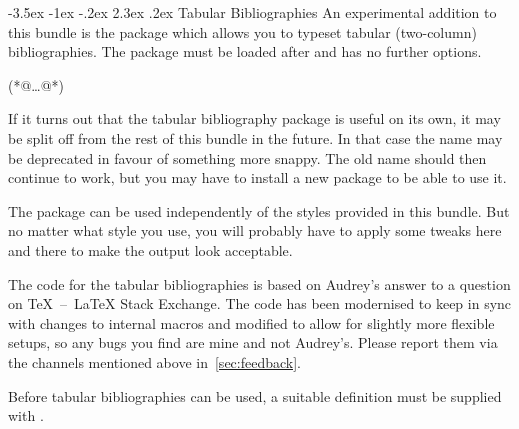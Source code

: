 \documentclass[11pt,a4paper]{article}
\makeatletter
\def\tex{TeX}%
\def\latex{LaTeX}%
\let\accentcolour\spotcolor
\newcommand*{\allsectionsfont}{\sffamily\accentcolour}
\renewcommand\section{\@startsection {section}{1}{\z@}%
                                     {-3.5ex \@plus -1ex \@minus -.2ex}%
                                     {2.3ex \@plus.2ex}%
                                     {\normalfont\Large\bfseries\allsectionsfont}}
\makeatother
\begin{document}
\clearpage
\section{Tabular Bibliographies}\label{sec:tabularbib}
\label{exltd@itm@biblatex-ext-tabular}
An experimental addition to this bundle is the package
 which allows you to typeset tabular
(two-column) bibliographies.
The package must be loaded after  and has no further options.
\begin{biblatexcode}
\usepackage[(*@@*)]{biblatex}
(*@\dots @*)
\usepackage{biblatex-ext-tabular}
\end{biblatexcode}
If it turns out that the tabular bibliography package is useful on its own,
it may be split off from the rest of this bundle in the future.
In that case the name  may be deprecated in favour
of something more snappy.
The old name should then continue to work, but you may have to install a new
package to be able to use it.

The package  can be used independently of the styles
provided in this bundle.
But no matter what style you use, you will probably have to apply some tweaks
here and there to make the output look acceptable.

The code for the tabular bibliographies is based on Audrey's%
answer to a question%
on \tex{}~--~\latex{} Stack Exchange.
The code has been modernised to keep in sync with changes to internal macros
and modified to allow for slightly more flexible setups, so any bugs you find
are mine and not Audrey's. Please report them via the channels mentioned above
in~\cref{sec:feedback}.

Before tabular bibliographies can be used, a suitable definition
must be supplied with .
\end{document}
